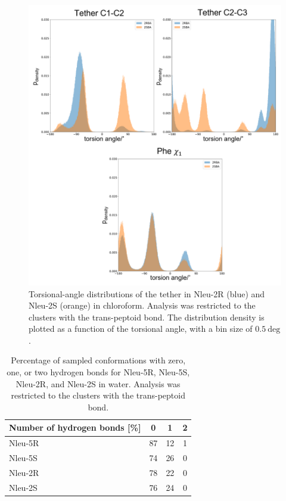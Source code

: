 \begin{figure}[h!]
    \centering
    \includegraphics[width=\textwidth]{7_chapter_5/fig/results/dihedral_dist_Wat.png}
    \caption{Torsional-angle distributions of the tether in Nleu-2R (blue) and Nleu-2S (orange) in chloroform. Analysis was restricted to the clusters with the trans-peptoid bond. The distribution density is plotted as a function of the torsional angle, with a bin size of $0.5~\text{deg}$.}
    \label{fig: SITorsion2RS}
\end{figure}


\FloatBarrier

\begin{table}[h!]
    \centering
    \caption{Percentage of sampled conformations with zero, one, or two hydrogen bonds for Nleu-5R, Nleu-5S, Nleu-2R, and Nleu-2S in water. Analysis was restricted to the clusters with the trans-peptoid bond.}
    \label{tab: hbondsratiowater}
    \begin{adjustbox}{max width=\textwidth}
    \begin{tabular}{lccc}
    Number of hydrogen bonds [\%] &	0 &	1 &	2 \\
    \hline
    Nleu-5R  &	87	& 12	& 1 \\
    Nleu-5S  &	74	& 26	& 0  \\
    Nleu-2R  &	78	& 22	& 0 \\
    Nleu-2S  &	76	& 24	& 0 \\
    \hline
    \end{tabular}
    \end{adjustbox}
\end{table}

